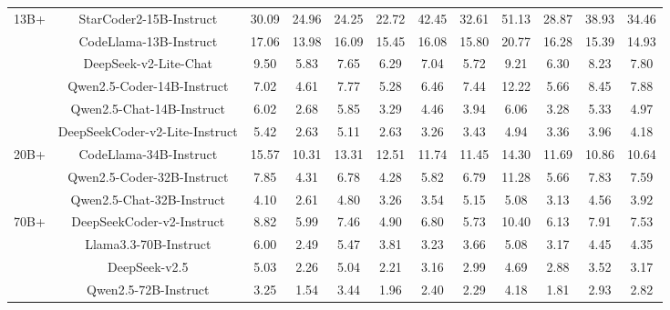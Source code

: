 \documentclass[11pt, a4paper, logo, copyright, nonumbering, amsart]{map}
\begin{document}
\begin{CJK*}{UTF8}{gbsn}
\begin{table*}[h!]
\begin{adjustbox}{width=\textwidth}
\begin{tabular}{c|c|cccccccccc}
    \midrule
    \multirow{6}{*}{13B+} 
    & StarCoder2-15B-Instruct & 30.09 & 24.96 & 24.25 & 22.72 & 42.45 & 32.61 & 51.13 & 28.87 & 38.93 & 34.46 \\
    & CodeLlama-13B-Instruct & 17.06 & 13.98 & 16.09 & 15.45 & 16.08 & 15.80 & 20.77 & 16.28 & 15.39 & 14.93 \\
    & DeepSeek-v2-Lite-Chat & 9.50 & 5.83 & 7.65 & 6.29 & 7.04 & 5.72 & 9.21 & 6.30 & 8.23 & 7.80 \\
    & Qwen2.5-Coder-14B-Instruct & 7.02 & 4.61 & 7.77 & 5.28 & 6.46 & 7.44 & 12.22 & 5.66 & 8.45 & 7.88 \\
    & Qwen2.5-Chat-14B-Instruct & 6.02 & 2.68 & 5.85 & 3.29 & 4.46 & 3.94 & 6.06 & 3.28 & 5.33 & 4.97 \\
    & DeepSeekCoder-v2-Lite-Instruct & 5.42 & 2.63 & 5.11 & 2.63 & 3.26 & 3.43 & 4.94 & 3.36 & 3.96 & 4.18 \\
    
    \midrule
    \multirow{3}{*}{20B+} 
    & CodeLlama-34B-Instruct & 15.57 & 10.31 & 13.31 & 12.51 & 11.74 & 11.45 & 14.30 & 11.69 & 10.86 & 10.64 \\
    & Qwen2.5-Coder-32B-Instruct & 7.85 & 4.31 & 6.78 & 4.28 & 5.82 & 6.79 & 11.28 & 5.66 & 7.83 & 7.59 \\
    & Qwen2.5-Chat-32B-Instruct & 4.10 & 2.61 & 4.80 & 3.26 & 3.54 & 5.15 & 5.08 & 3.13 & 4.56 & 3.92 \\
    
    \midrule
    \multirow{4}{*}{70B+} 
    & DeepSeekCoder-v2-Instruct & 8.82 & 5.99 & 7.46 & 4.90 & 6.80 & 5.73 & 10.40 & 6.13 & 7.91 & 7.53 \\
    & Llama3.3-70B-Instruct & 6.00 & 2.49 & 5.47 & 3.81 & 3.23 & 3.66 & 5.08 & 3.17 & 4.45 & 4.35 \\
    & DeepSeek-v2.5 & 5.03 & 2.26 & 5.04 & 2.21 & 3.16 & 2.99 & 4.69 & 2.88 & 3.52 & 3.17 \\
    & Qwen2.5-72B-Instruct & 3.25 & 1.54 & 3.44 & 1.96 & 2.40 & 2.29 & 4.18 & 1.81 & 2.93 & 2.82 \\
    

\end{tabular}
\end{adjustbox}
\end{table*}
\end{CJK*}
\end{document}
